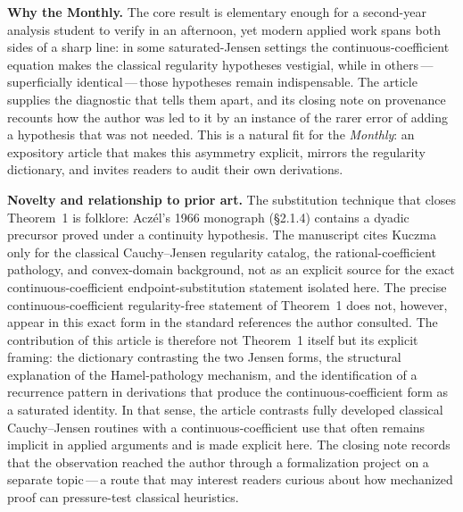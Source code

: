 \documentclass[12pt]{article}
\begin{document}
\bigskip
\noindent\textbf{Why the Monthly.}
The core result is elementary enough for a second-year analysis student
to verify in an afternoon, yet modern applied work spans both
sides of a sharp line: in some saturated-Jensen settings the
continuous-coefficient equation makes the classical regularity
hypotheses vestigial, while in others\,---\,superficially
identical\,---\,those hypotheses remain indispensable. The article
supplies the diagnostic that tells them apart, and its closing note on provenance recounts how the author was led to it by an
instance of the rarer error of adding a hypothesis that was not
needed. This is a natural fit for the \textit{Monthly}: an expository article that
makes this asymmetry explicit, mirrors the regularity dictionary, and
invites readers to audit their own derivations.

\bigskip
\noindent\textbf{Novelty and relationship to prior art.}
The substitution technique that closes Theorem~1 is folklore:
Acz\'{e}l's 1966 monograph (\S2.1.4) contains a dyadic precursor proved
under a continuity hypothesis. The manuscript cites Kuczma only for the classical Cauchy--Jensen regularity catalog, the rational-coefficient pathology, and convex-domain background, not as an explicit source for the exact continuous-coefficient endpoint-substitution statement isolated here. The precise
continuous-coefficient regularity-free statement of Theorem~1 does
not, however, appear in this exact form in the standard references the
author consulted. The contribution of this article is therefore not
Theorem~1 itself but its explicit framing: the dictionary
contrasting the two Jensen forms, the structural explanation of the
Hamel-pathology mechanism, and the identification of a recurrence
pattern in derivations that produce the continuous-coefficient form as
a saturated identity. In that sense, the article contrasts fully developed classical Cauchy--Jensen routines with a continuous-coefficient use that often remains implicit in applied arguments and is made explicit here. The closing note records that the observation
reached the author through a formalization project on a separate
topic\,---\,a route that may interest readers curious about how
mechanized proof can pressure-test classical heuristics.
\end{document}
